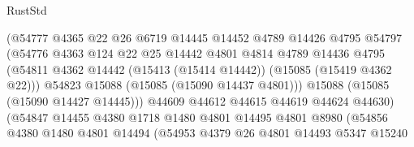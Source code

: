\begin{lexlean}{RustStd}
\begin{coremodule}
                                  (@54777
                                    @4365
                                    @22
                                    @26
                                    @6719
                                    @14445
                                    @14452
                                    @4789
                                    @14426
                                    @4795
                                    @54797
                                    (@54776
                                      @4363
                                      @124
                                      @22
                                      @25
                                      @14442
                                      @4801
                                      @4814
                                      @4789
                                      @14436
                                      @4795
                                      (@54811
                                        @4362
                                        @14442
                                        (@15413 (@15414 @14442))
                                        (@15085 (@15419 @4362 @22)))
                                      @54823
                                      @15088
                                      (@15085 (@15090 @14437 @4801)))
                                    @15088
                                    (@15085 (@15090 @14427 @14445)))
                                  @44609
                                  @44612
                                  @44615
                                  @44619
                                  @44624
                                  @44630)
                                (@54847
                                  @14455
                                  @4380
                                  @1718
                                  @1480
                                  @4801
                                  @14495
                                  @4801
                                  @8980
                                  (@54856
                                    @4380
                                    @1480
                                    @4801
                                    @14494
                                    (@54953
                                      @4379
                                      @26
                                      @4801
                                      @14493
                                      @5347
                                      @15240

\end{coremodule}
\end{lexlean}
